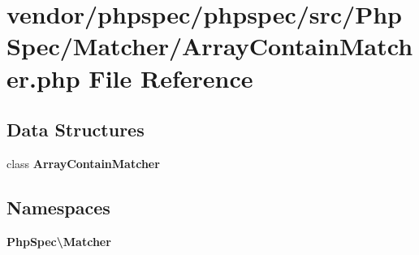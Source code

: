 \section{vendor/phpspec/phpspec/src/\+Php\+Spec/\+Matcher/\+Array\+Contain\+Matcher.php File Reference}
\label{_array_contain_matcher_8php}
\subsection*{Data Structures}
\begin{DoxyCompactItemize}
\item 
class {\bf Array\+Contain\+Matcher}
\end{DoxyCompactItemize}
\subsection*{Namespaces}
\begin{DoxyCompactItemize}
\item 
 {\bf Php\+Spec\textbackslash{}\+Matcher}
\end{DoxyCompactItemize}
